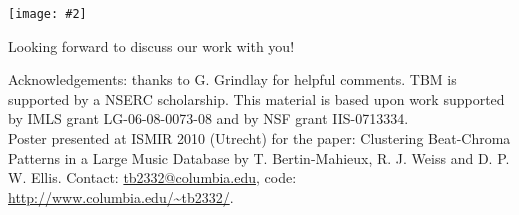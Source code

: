 \documentclass[portrait,a0b,final]{a0poster}
\newenvironment{poster}{
  \begin{center}
  \begin{minipage}[c]{0.98\textwidth}
}{
  \end{minipage} 
  \end{center}
}
\newcommand{\myfig}[3][0]{
\begin{center}
  \vspace{1.5cm}
  \texttt{[image: \#2]}
  \nobreak\medskip
\end{center}}
\begin{document}
\begin{poster}
\begin{multicols}{3}
\begin{small}


\end{small}

\vspace{-2cm}
\myfig[0]{authors.eps}{.8}
\vspace{-2cm}
\begin{center}
\begin{minipage}[c]{.7\columnwidth}
\begin{center}
\begin{small}
Looking forward to discuss our work with you!
\end{small}
\end{center}
\end{minipage}
\end{center}



\end{multicols}

\vspace{1cm}
\begin{minipage}{\textwidth}
\begin{small}
\begin{flushright}
Acknowledgements: thanks to G. Grindlay for
helpful comments. TBM is supported by a
NSERC scholarship. This material is based upon work
supported by IMLS grant LG-06-08-0073-08 and by NSF
grant IIS-0713334. \\
Poster presented at ISMIR 2010 (Utrecht) for the paper:
Clustering Beat-Chroma Patterns in a Large Music Database by
T. Bertin-Mahieux, R. J. Weiss and D. P. W. Ellis. Contact:
\url{tb2332@columbia.edu}, code: \url{http://www.columbia.edu/~tb2332/}.
\end{flushright}
\end{small}
\end{minipage}

\end{poster}
\end{document}
